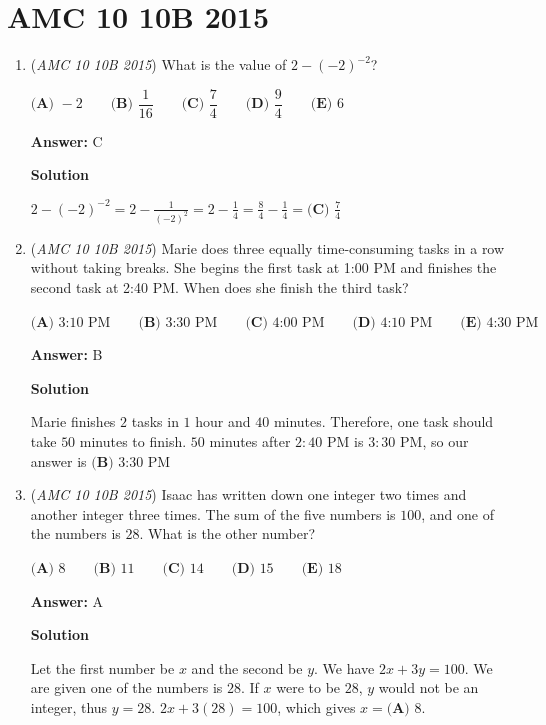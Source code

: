 \section{AMC 10 10B 2015}
        \begin{enumerate}
        	\item (\textit{AMC 10 10B 2015}) What is the value of $2-(-2)^{-2}$?


 $\textbf{(A) } -2 \qquad\textbf{(B) } \dfrac{1}{16} \qquad\textbf{(C) } \dfrac{7}{4} \qquad\textbf{(D) } \dfrac{9}{4} \qquad\textbf{(E) } 6$

 \textbf{Answer: }C



\textbf{Solution}

$2-(-2)^{-2}=2-\frac{1}{(-2)^2}=2-\frac{1}{4}=\frac{8}{4}-\frac{1}{4}=\boxed{\textbf{(C) }\frac{7}{4}}$



	\item (\textit{AMC 10 10B 2015}) Marie does three equally time-consuming tasks in a row without taking breaks. She begins the first task at 1:00 PM and finishes the second task at 2:40 PM. When does she finish the third task?


 $\textbf{(A) }\text{3:10 PM}\qquad\textbf{(B) }\text{3:30 PM}\qquad\textbf{(C) }\text{4:00 PM}\qquad\textbf{(D) }\text{4:10 PM}\qquad\textbf{(E) }\text{4:30 PM}$

 \textbf{Answer: }B



\textbf{Solution}

Marie finishes $2$ tasks in $1$ hour and $40$ minutes. Therefore, one task should take $50$ minutes to finish. $50$ minutes after $2\!:\!40$ PM is $3\!:\!30$ PM, so our answer is $\boxed{\textbf{(B) }\text{3:30 PM}}$



	\item (\textit{AMC 10 10B 2015}) Isaac has written down one integer two times and another integer three times. The sum of the five numbers is $100$, and one of the numbers is $28.$ What is the other number?


 $\textbf{(A) } 8 \qquad\textbf{(B) } 11 \qquad\textbf{(C) } 14 \qquad\textbf{(D) } 15 \qquad\textbf{(E) } 18$

 \textbf{Answer: }A



\textbf{Solution}

Let the first number be $x$ and the second be $y$. We have $2x+3y=100$. We are given one of the numbers is $28$. If $x$ were to be $28$, $y$ would not be an integer, thus $y=28$.  $2x+3(28)=100$, which gives $x=\boxed{\textbf{(A) }8}$.


\end{enumerate}
